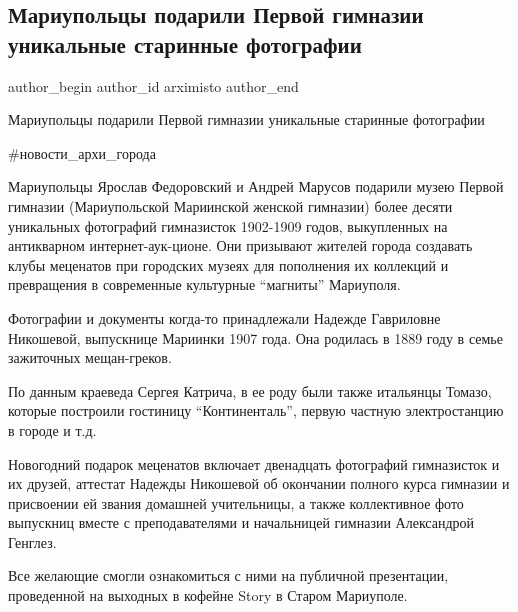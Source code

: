  
 
 
 
 

\subsection{Мариупольцы подарили Первой гимназии уникальные старинные фотографии}
\label{sec:20_12_2021.fb.arximisto.1.mariupolcy_podarili_pervoj_gimnazii_fotografii}

\ifcmt
 author_begin
   author_id arximisto
 author_end
\fi

Мариупольцы подарили Первой гимназии уникальные старинные фотографии

\#новости\_архи\_города

Мариупольцы Ярослав Федоровский и Андрей Марусов подарили музею Первой гимназии
(Мариупольской Мариинской женской гимназии) более десяти уникальных фотографий
гимназисток 1902-1909 годов, выкупленных на антикварном
интернет-аук\hyp{}ционе. Они призывают жителей города создавать клубы меценатов
при городских музеях для пополнения их коллекций и превращения в современные
культурные \enquote{магниты} Мариуполя.

Фотографии и документы когда-то принадлежали Надежде Гавриловне Никошевой,
выпускнице Мариинки 1907 года. Она родилась в 1889 году в семье зажиточных
мещан-греков. 

По данным краеведа Сергея Катрича, в ее роду были также итальянцы Томазо,
которые построили гостиницу \enquote{Континенталь}, первую частную
электростанцию в городе и т.д. 

Новогодний подарок меценатов включает двенадцать фотографий гимназисток и их
друзей, аттестат Надежды Никошевой об окончании полного курса гимназии и
присвоении ей звания домашней учительницы, а также коллективное фото выпускниц
вместе с преподавателями и начальницей гимназии Александрой Генглез.

Все желающие смогли ознакомиться с ними на публичной презентации, проведенной
на выходных в кофейне Story в Старом Мариуполе.

